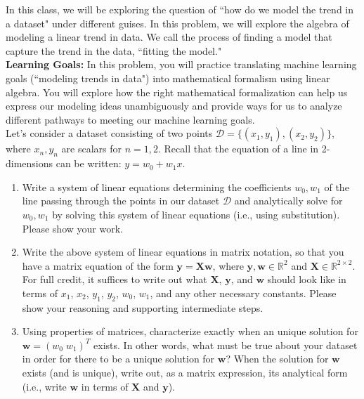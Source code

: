 \documentclass{../harvardml}
\theoremstyle{definition}
\theoremstyle{plain}
\begin{document}
\newpage
\begin{problem}
In this class, we will be exploring the question of ``how do we model the trend in a dataset" under different guises. In this problem, we will explore the algebra of modeling a linear trend in data. We call the process of finding a model that capture the trend in the data, ``fitting the model."\\

\noindent \textbf{Learning Goals:} In this problem, you will practice translating machine learning goals (``modeling trends in data") into mathematical formalism using linear algebra. You will explore how the right mathematical formalization can help us express our modeling ideas unambiguously and provide ways for us to analyze different pathways to meeting our machine learning goals.\\

\noindent Let's consider a dataset consisting of two points $\mathcal{D} = \{(x_1, y_1), (x_2, y_2)\}$, where $x_n, y_n$ are scalars for $n=1, 2$. Recall that the equation of a line in 2-dimensions can be written: $y = w_0 + w_1x$. 
\begin{enumerate}
    \item Write a system of linear equations determining the coefficients $w_0, w_1$ of the line passing through the points in our dataset $\mathcal{D}$ and analytically solve for $w_0, w_1$ by solving this system of linear equations (i.e., using substitution). Please show your work.
    \item Write the above system of linear equations in matrix notation, so that you have a matrix equation of the form $\mathbf{y} = \mathbf{X}\mathbf{w}$, where $\mathbf{y}, \mathbf{w} \in \mathbb{R}^2$ and $\mathbf{X} \in \mathbb{R}^{2\times 2}$. For full credit, it suffices to write out what $\mathbf{X}$, $\mathbf{y}$, and $\mathbf{w}$ should look like in terms of $x_1$, $x_2$, $y_1$, $y_2$, $w_0$, $w_1$, and any other necessary constants. Please show your reasoning and supporting intermediate steps.
    \item Using properties of matrices, characterize exactly when an unique solution for  $\mathbf{w}=\left(w_0 \; w_1 \right)^{T}$ exists. In other words, what must be true about your dataset in order for there to be a unique solution for $\mathbf{w}$? When the solution for $\mathbf{w}$ exists (and is unique), write out, as a matrix expression, its analytical form (i.e., write $\mathbf{w}$ in terms of $\mathbf{X}$ and $\mathbf{y}$).
    

\end{enumerate}
\end{problem}
\end{document}
